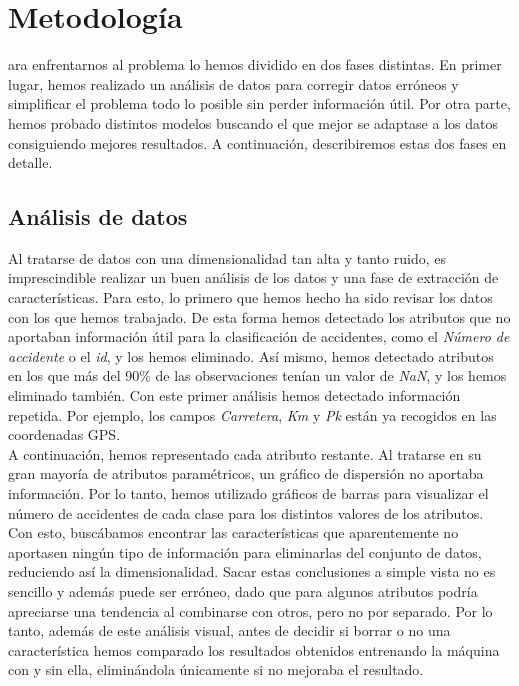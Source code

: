 \documentclass[journal,twoside]{JoPhA}
\begin{document}
\section{Metodología}
ara enfrentarnos al problema lo hemos dividido en dos fases distintas. En primer lugar, hemos realizado un análisis de datos para corregir datos erróneos y simplificar el problema todo lo posible sin perder información útil. Por otra parte, hemos probado distintos modelos buscando el que mejor se adaptase a los datos consiguiendo mejores resultados. A continuación, describiremos estas dos fases en detalle.

\subsection{Análisis de datos}
Al tratarse de datos con una dimensionalidad tan alta y tanto ruido, es imprescindible realizar un buen análisis de los datos y una fase de extracción de características. Para esto, lo primero que hemos hecho ha sido revisar los datos con los que hemos trabajado. De esta forma hemos detectado los atributos que no aportaban información útil para la clasificación de accidentes, como el \textit{Número de accidente} o el \textit{id}, y los hemos eliminado. Así mismo, hemos detectado atributos en los que más del 90\% de las observaciones tenían un valor de \textit{NaN}, y los hemos eliminado también. Con este primer análisis hemos detectado información repetida. Por ejemplo, los campos \textit{Carretera}, \textit{Km} y \textit{Pk} están ya recogidos en las coordenadas GPS. \\

A continuación, hemos representado cada atributo restante. Al tratarse en su gran mayoría de atributos paramétricos, un gráfico de dispersión no aportaba información. Por lo tanto, hemos utilizado gráficos de barras para visualizar el número de accidentes de cada clase para los distintos valores de los atributos. Con esto, buscábamos encontrar las características que aparentemente no aportasen ningún tipo de información para eliminarlas del conjunto de datos, reduciendo así la dimensionalidad. Sacar estas conclusiones a simple vista no es sencillo y además puede ser erróneo, dado que para algunos atributos podría apreciarse una tendencia al combinarse con otros, pero no por separado. Por lo tanto, además de este análisis visual, antes de decidir si borrar o no una característica hemos comparado los resultados obtenidos entrenando la máquina con y sin ella, eliminándola únicamente si no mejoraba el resultado. \\
\end{document}
